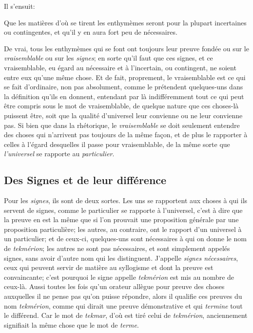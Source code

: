 Il s'ensuit:

\begin{emphpar}
      Que les matières d'où se tirent les enthymèmes seront pour la plupart incertaines ou contingentes, et qu'il y en aura fort peu de nécessaires.
\end{emphpar}

De vrai, tous les enthymèmes qui se font ont toujours leur preuve fondée ou sur le \emph{vraisemblable} ou sur les \emph{signes}; en sorte qu'il faut que
ces signes, et ce vraisemblable, eu égard au nécessaire et à l'incertain, ou contingent, ne soient entre eux qu'une même chose. Et de fait, proprement,
le vraisemblable est ce qui se fait d'ordinaire, non %
pas absolument, comme le prétendent quelques-uns dans la définition qu'ils en donnent, entendant par là indifféremment tout ce qui peut être compris sous
le mot de vraisemblable, de quelque nature que ces choses-là puissent être, soit que la qualité d'universel leur convienne ou ne leur convienne pas. Si
bien que dans la rhétorique, le \emph{vraisemblable} se doit seulement entendre des choses qui n'arrivent pas toujours de la même façon, et de plus le rapporter
à celles à l'égard desquelles il passe pour vraisemblable, de la même sorte que \emph{l'universel} se rapporte au \emph{particulier}.

\subsection{Des Signes et de leur différence}

Pour les \emph{signes}, ils sont de deux sortes. Les uns se rapportent aux choses à qui ils servent de signes, comme le particulier se rapporte à l'universel,
c'est à dire que la preuve en est la même que si l'on prouvait une proposition générale par une proposition particulière; les autres, au contraire, ont
le rapport d'un universel à un particulier; et de ceux-ci, quelques-uns sont nécessaires à qui on donne le nom de \emph{tekmérion}; les autres ne sont
pas nécessaires, et sont simplement appelés signes, sans avoir d'autre nom qui les distinguent. J'appelle \emph{signes nécessaires}, ceux qui peuvent
servir de matière au syllogisme et dont la preuve est convaincante; c'est pourquoi le signe appelle \emph{tekmérion} est mis au nombre de ceux-là. Aussi
toutes les fois qu'un orateur allègue pour preuve des choses auxquelles il ne pense pas qu'on puisse répondre, alors il qualifie ces preuves du nom
\emph{tekmérion}, comme qui dirait une preuve démonstrative et qui \emph{termine} tout le différend. Car le mot de \emph{tekmar}, d'où est tiré celui de
\emph{tekmérion}, anciennement signifiait la même chose que le mot de \emph{terme}.

